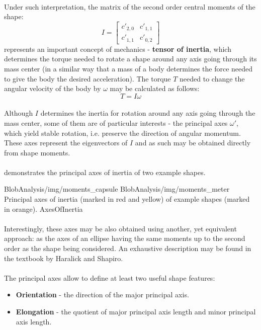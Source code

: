 \paragraph*{}
Under such interpretation, the matrix of the second order central moments of the shape:
\[
I = \begin{bmatrix}
c'_{2,0} & c'_{1,1}\\
c'_{1,1} & c'_{0,2}
\end{bmatrix}
\]
represents an important concept of mechanics - \textbf{tensor of inertia}, which determines the torque needed to rotate a shape around any axis going through its mass center (in a similar way that a mass of a body determines the force needed to give the body the desired acceleration). The torque $T$ needed to change the angular velocity of the body by $\omega$ may be calculated as follows:
\[
	T = I\omega
\]

\paragraph*{}
Although $I$ determines the inertia for rotation around any axis going through the mass center, some of them are of particular interests - the principal axes $\omega'$, which yield stable rotation, i.e. preserve the direction of angular momentum. These axes represent the eigenvectors of $I$ and as such may be obtained directly from shape moments.

\paragraph*{}
 demonstrates the principal axes of inertia of two example shapes.

\twoFigures
{BlobAnalysis/img/moments_capsule}
{BlobAnalysis/img/moments_meter}
{Principal axes of inertia (marked in red and yellow) of example shapes (marked in orange).}
{AxesOfInertia}
{\basicWidth}

\paragraph*{}
Interestingly, these axes may be also obtained using another, yet equivalent approach: as the axes of an ellipse having the same moments up to the second order as the shape being considered. An exhaustive description may be found in the textbook\cite[p.~73-75]{Haralick92} by Haralick and Shapiro.

\paragraph*{}
The principal axes allow to define at least two useful shape features:
\begin{itemize}
	\item \textbf{Orientation} - the direction of the major principal axis.
	\item \textbf{Elongation} - the quotient of major principal axis length and minor principal axis length.
\end{itemize}  

